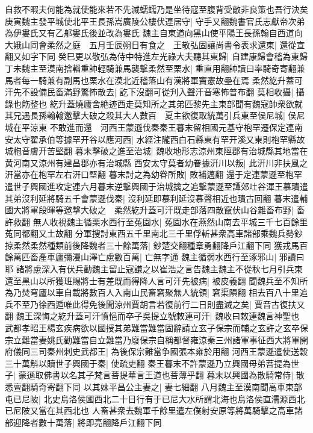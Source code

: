 自救不暇夫何能為就使能來若不先滅蠕蠕乃是坐待寇至腹背受敵非良策也吾行決矣庚寅魏主發平城使北平王長孫嵩廣陵公樓伏連居守|{
	守手又翻魏書官氏志獻帝次弟為伊婁氏又有乙郍婁氏後並改為婁氏}
魏主自東道向黑山使平陽王長孫翰自西道向大娥山同會柔然之庭　五月壬辰朔日有食之　王敬弘固讓尚書令表求還東|{
	還從宣翻又如字下同}
癸巳更以敬弘為侍中特進左光祿大夫聽其東歸|{
	自建康歸會稽為東歸}
丁未魏主至漠南捨輜重帥輕騎兼馬襲撃柔然至栗水|{
	重直用翻帥讀曰率騎奇寄翻兼馬者每一騎兼有副馬也栗水在漠北近稽落山有漢將軍竇憲故壘在焉}
柔然紇升蓋可汗先不設備民畜滿野驚怖散去|{
	訖下沒翻可從刋入聲汗音寒怖普布翻}
莫相收攝|{
	攝錄也飭整也}
紇升蓋燒廬舍絶迹西走莫知所之其弟匹黎先主東部聞有魏寇帥衆欲就其兄遇長孫翰翰邀擊大破之殺其大人數百　夏主欲復取統萬引兵東至侯尼城|{
	侯尼城在平涼東}
不敢進而還　河西王蒙遜伐秦秦王暮末留相國元基守枹罕遷保定連南安太守翟承伯等據罕开谷以應河西|{
	水經注隴西白石縣東有罕开溪又東則枹罕縣故城枹音膚开苦堅翻}
暮末擊破之進至治城|{
	魏收地形志涼州東陘郡有治城縣其地當在黄河南又涼州有建昌郡亦有治城縣}
西安太守莫者幼眷據汧川以叛|{
	此汧川非扶風之汧當亦在枹罕左右汧口堅翻}
暮末討之為幼眷所敗|{
	敗補邁翻}
還于定連蒙遜至枹罕遣世子興國進攻定連六月暮末逆撃興國于治城擒之追撃蒙遜至譚郊吐谷渾王慕璝遣其弟沒利延將騎五千會蒙遜伐秦|{
	沒利延即慕利延沒慕聲相近也璝古回翻}
暮末遣輔國大將軍段暉等邀撃大破之　柔然紇升蓋可汗既走部落四散竄伏山谷雜畜布野|{
	畜許救翻}
無人收視魏主循栗水西行至菟園水|{
	菟園水在燕然山南去平城三千七百餘里菟同都翻又土故翻}
分軍搜討東西五千里南北三千里俘斬甚衆高車諸部乘魏兵勢鈔掠柔然柔然種類前後降魏者三十餘萬落|{
	鈔楚交翻種章勇翻降戶江翻下同}
獲戎馬百餘萬匹畜產車廬彌漫山澤亡慮數百萬|{
	亡無字通}
魏主循弱水西行至涿邪山|{
	邪讀曰耶}
諸將慮深入有伏兵勸魏主留止寇謙之以崔浩之言告魏主魏主不從秋七月引兵東還至黑山以所獲班賜將士有差既而得降人言可汗先被病|{
	被皮義翻}
聞魏兵至不知所為乃焚穹廬以車自載將數百人入南山民畜窘聚無人統領|{
	窘渠隕翻}
相去百八十里追兵不至乃徐西遁唯此得免後聞涼州賈胡言若復前行二日則盡滅之矣|{
	賈音古復扶又翻}
魏王深悔之紇升蓋可汗憤悒而卒子吳提立號敇連可汗|{
	魏收曰敇連魏言神聖也}
武都孝昭王楊玄疾病欲以國授其弟難當難當固辭請立玄子保宗而輔之玄許之玄卒保宗立難當妻姚氏勸難當自立難當乃廢保宗自稱都督雍涼秦三州諸軍事征西大將軍開府儀同三司秦州刺史武都王|{
	為後保宗難當争國張本雍於用翻}
河西王蒙遜遣使送穀三十萬斛以贖世子興國于秦|{
	使疏吏翻}
秦王暮末不許蒙遜乃立興國母弟菩提為世子|{
	蒙遜取佛書以名其子梵言菩提華言王道也菩薄乎翻}
暮末以興國為散騎常侍|{
	散悉亶翻騎奇寄翻下同}
以其妹平昌公主妻之|{
	妻七細翻}
八月魏主至漠南聞高車東部屯已尼陂|{
	北史烏洛侯國西北二十日行有于已尼大水所謂北海也烏洛侯直濡源西北已尼陂又當在其西北也}
人畜甚衆去魏軍千餘里遣左僕射安原等將萬騎擊之高車諸部迎降者數十萬落|{
	將即亮翻降戶江翻下同}
